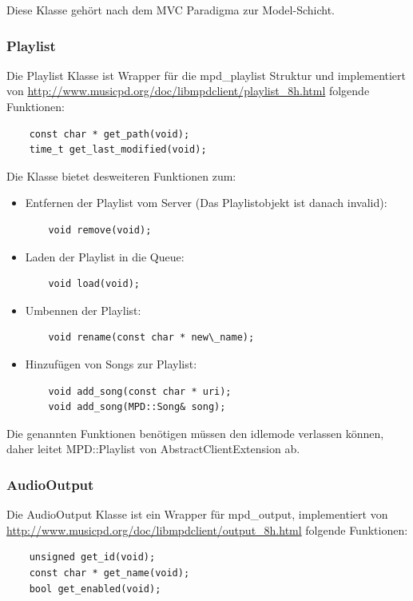 Diese Klasse gehört nach dem MVC Paradigma zur Model-Schicht.

\subsubsection{Playlist}
Die Playlist Klasse ist Wrapper für die mpd\_playlist Struktur und
implementiert von \url{http://www.musicpd.org/doc/libmpdclient/playlist\_8h.html} folgende Funktionen:
\begin{verbatim}
    const char * get_path(void);
    time_t get_last_modified(void);
\end{verbatim}

Die Klasse bietet desweiteren  Funktionen zum:
\begin{itemize}
\item Entfernen der Playlist vom Server (Das Playlistobjekt ist danach invalid):
\begin{verbatim}
    void remove(void);
\end{verbatim}

\item Laden der Playlist in die Queue:
\begin{verbatim}
    void load(void);
\end{verbatim}

\item Umbennen der Playlist:
\begin{verbatim}
    void rename(const char * new\_name);
\end{verbatim}

\item Hinzufügen von Songs zur Playlist:
\begin{verbatim}
    void add_song(const char * uri);
    void add_song(MPD::Song& song);
\end{verbatim}
\end{itemize}
Die genannten Funktionen benötigen müssen den idlemode verlassen können,
daher leitet MPD::Playlist von AbstractClientExtension ab.

\subsubsection{AudioOutput}
Die AudioOutput Klasse ist ein Wrapper für mpd\_output, 
implementiert von \url{http://www.musicpd.org/doc/libmpdclient/output\_8h.html} folgende Funktionen:
\begin{verbatim}
    unsigned get_id(void);
    const char * get_name(void);
    bool get_enabled(void);
\end{verbatim}

